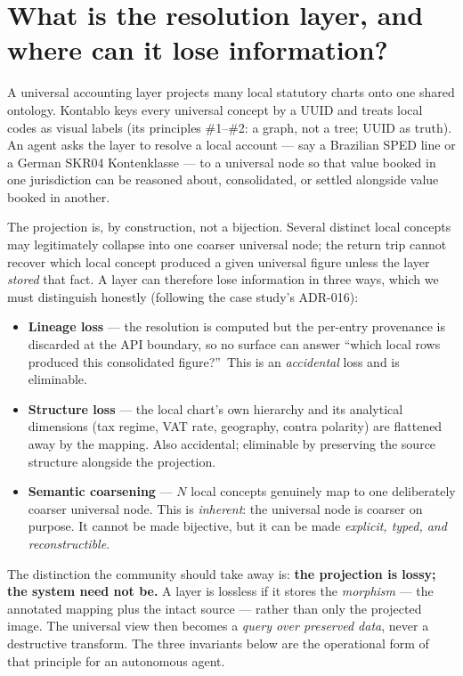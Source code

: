 \documentclass[11pt]{clapps}  %
\begin{document}
\section{What is the resolution layer, and where can it lose information?}

A universal accounting layer projects many local statutory charts onto one
shared ontology. Kontablo keys every universal concept by a UUID and treats
local codes as visual labels (its principles \#1--\#2: a graph, not a tree;
UUID as truth). An agent asks the layer to resolve a local account --- say a
Brazilian SPED line or a German SKR04 Kontenklasse --- to a universal node so
that value booked in one jurisdiction can be reasoned about, consolidated, or
settled alongside value booked in another.

The projection is, by construction, not a bijection. Several distinct local
concepts may legitimately collapse into one coarser universal node; the return
trip cannot recover which local concept produced a given universal figure unless
the layer \emph{stored} that fact. A layer can therefore lose information in
three ways, which we must distinguish honestly (following the case study's
ADR-016):

\begin{itemize}
  \item \textbf{Lineage loss} --- the resolution is computed but the
  per-entry provenance is discarded at the API boundary, so no surface can
  answer ``which local rows produced this consolidated figure?''\ This is an
  \emph{accidental} loss and is eliminable.
  \item \textbf{Structure loss} --- the local chart's own hierarchy and its
  analytical dimensions (tax regime, VAT rate, geography, contra polarity) are
  flattened away by the mapping. Also accidental; eliminable by preserving the
  source structure alongside the projection.
  \item \textbf{Semantic coarsening} --- $N$ local concepts genuinely map to
  one deliberately coarser universal node. This is \emph{inherent}: the
  universal node is coarser on purpose. It cannot be made bijective, but it can
  be made \emph{explicit, typed, and reconstructible}.
\end{itemize}

The distinction the community should take away is: \textbf{the projection is
lossy; the system need not be.} A layer is lossless if it stores the
\emph{morphism} --- the annotated mapping plus the intact source --- rather than
only the projected image. The universal view then becomes a \emph{query over
preserved data}, never a destructive transform. The three invariants below are
the operational form of that principle for an autonomous agent.
\end{document}
